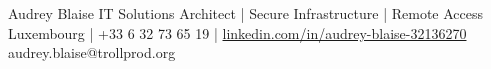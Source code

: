 \documentclass[10pt,a4paper]{article}
\begin{document}
\cvheader
  {Audrey Blaise}
  {IT Solutions Architect | Secure Infrastructure | Remote Access}
  {Luxembourg | +33 6 32 73 65 19 | \href{https://www.linkedin.com/in/audrey-blaise-32136270}{linkedin.com/in/audrey-blaise-32136270}}
  {audrey.blaise@trollprod.org}






\end{document}
